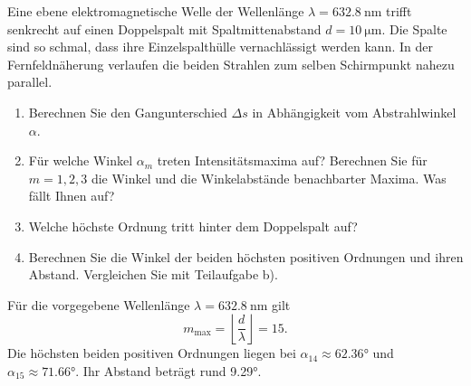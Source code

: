 \begin{ExerciseBlock}
Eine ebene elektromagnetische Welle der Wellenlänge $\lambda=\qty{632.8}{\nano\metre}$ trifft senkrecht auf einen Doppelspalt mit Spaltmittenabstand $d=\qty{10}{\micro\metre}$. Die Spalte sind so schmal, dass ihre Einzelspalthülle vernachlässigt werden kann. In der Fernfeldnäherung verlaufen die beiden Strahlen zum selben Schirmpunkt nahezu parallel.
\begin{center}
\end{center}
\begin{enumerate}
\item Berechnen Sie den Gangunterschied $\Delta s$ in Abhängigkeit vom Abstrahlwinkel $\alpha$.
\item Für welche Winkel $\alpha_m$ treten Intensitätsmaxima auf? Berechnen Sie für $m=1,2,3$ die Winkel und die Winkelabstände benachbarter Maxima. Was fällt Ihnen auf?
\item Welche höchste Ordnung tritt hinter dem Doppelspalt auf?
\item Berechnen Sie die Winkel der beiden höchsten positiven Ordnungen und ihren Abstand. Vergleichen Sie mit Teilaufgabe b).
\end{enumerate}
\end{ExerciseBlock}
\begin{Solution}
\begin{RemarkBox}[title=Korrektur zur handschriftlichen Lösung]
Für die vorgegebene Wellenlänge $\lambda=\qty{632.8}{\nano\metre}$ gilt
\[
 m_\mathrm{max}=\left\lfloor\frac{d}{\lambda}\right\rfloor=15.
\]
Die höchsten beiden positiven Ordnungen liegen bei $\alpha_{14}\approx\ang{62.36}$ und $\alpha_{15}\approx\ang{71.66}$. Ihr Abstand beträgt rund \ang{9.29}.
\end{RemarkBox}
\end{Solution}
